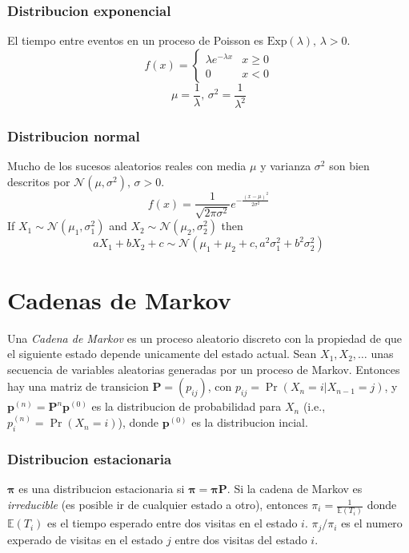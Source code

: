 \subsubsection{Distribucion exponencial}
El tiempo entre eventos en un proceso de Poisson es $\textrm{Exp}(\lambda),\,\lambda>0$.
\[f(x) = \left\{
\begin{array}{cl}
\lambda e^{-\lambda x} & x\geq0\\
0 & x<0
\end{array}\right.\]
\[\mu=\frac{1}{\lambda},\,\sigma^2=\frac{1}{\lambda^2}\]

\subsubsection{Distribucion normal}
Mucho de los sucesos aleatorios reales con media $\mu$ y varianza $\sigma^2$ son bien descritos por $\mathcal{N}(\mu,\sigma^2),\,\sigma>0$.
\[ f(x) = \frac{1}{\sqrt{2\pi\sigma^2}}e^{-\frac{(x-\mu)^2}{2\sigma^2}} \]
If $X_1 \sim \mathcal{N}(\mu_1,\sigma_1^2)$ and $X_2 \sim \mathcal{N}(\mu_2,\sigma_2^2)$ then
\[ aX_1 + bX_2 + c \sim \mathcal{N}(\mu_1+\mu_2+c,a^2\sigma_1^2+b^2\sigma_2^2) \]

\section{Cadenas de Markov}
Una \emph{Cadena de Markov} es un proceso aleatorio discreto con la propiedad de que el siguiente estado depende unicamente del estado actual.
Sean $X_1,X_2,\ldots$ unas secuencia de variables aleatorias generadas por un proceso de Markov.
Entonces hay una matriz de transicion $\mathbf{P} = (p_{ij})$, con $p_{ij} = \Pr(X_n = i | X_{n-1} = j)$,
y $\mathbf{p}^{(n)} = \mathbf P^n \mathbf p^{(0)}$ es la  distribucion de probabilidad para  $X_n$ (i.e., $p^{(n)}_i = \Pr(X_n = i)$),
donde $\mathbf{p}^{(0)}$ es la distribucion incial.

\subsubsection{Distribucion estacionaria}
$\mathbf{\pi}$ es una distribucion estacionaria si $\mathbf{\pi} = \mathbf{\pi P}$.
Si la cadena de Markov es \emph{irreducible} (es posible ir de cualquier estado a otro),
entonces $\pi_i = \frac{1}{\mathbb{E}(T_i)}$ donde $\mathbb{E}(T_i)$  es el tiempo esperado entre dos visitas en el estado $i$.
$\pi_j/\pi_i$ es el numero experado de visitas en el estado $j$ entre dos visitas del estado $i$.

